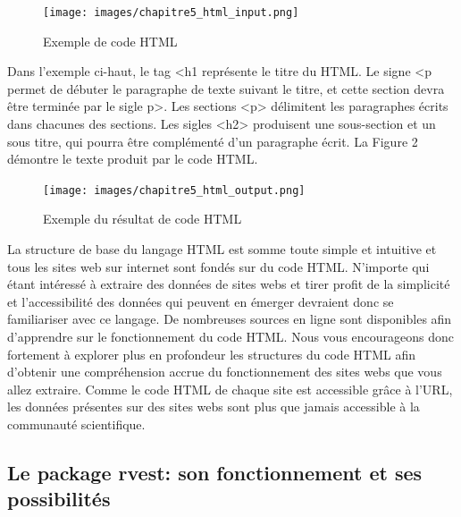 \documentclass[
  letterpaper,
  DIV=11,
  numbers=noendperiod]{scrreprt}
\begin{document}
\begin{figure}[H]

{\centering \texttt{[image: images/chapitre5\_html\_input.png]}

}

\caption{Exemple de code HTML}

\end{figure}%

Dans l'exemple ci-haut, le tag \textless h1 représente le titre du HTML.
Le signe \textless p permet de débuter le paragraphe de texte suivant le
titre, et cette section devra être terminée par le sigle p\textgreater.
Les sections \textless p\textgreater{} délimitent les paragraphes écrits
dans chacunes des sections. Les sigles \textless h2\textgreater{}
produisent une sous-section et un sous titre, qui pourra être
complémenté d'un paragraphe écrit. La Figure 2 démontre le texte produit
par le code HTML.

\begin{figure}[H]

{\centering \texttt{[image: images/chapitre5\_html\_output.png]}

}

\caption{Exemple du résultat de code HTML}

\end{figure}%

La structure de base du langage HTML est somme toute simple et intuitive
et tous les sites web sur internet sont fondés sur du code HTML.
N'importe qui étant intéressé à extraire des données de sites webs et
tirer profit de la simplicité et l'accessibilité des données qui peuvent
en émerger devraient donc se familiariser avec ce langage. De nombreuses
sources en ligne sont disponibles afin d'apprendre sur le fonctionnement
du code HTML. Nous vous encourageons donc fortement à explorer plus en
profondeur les structures du code HTML afin d'obtenir une compréhension
accrue du fonctionnement des sites webs que vous allez extraire. Comme
le code HTML de chaque site est accessible grâce à l'URL, les données
présentes sur des sites webs sont plus que jamais accessible à la
communauté scientifique.

\subsection{\texorpdfstring{\textbf{Le package rvest: son fonctionnement
et ses
possibilités}}{Le package rvest: son fonctionnement et ses possibilités}}\label{le-package-rvest-son-fonctionnement-et-ses-possibilituxe9s}
\end{document}

